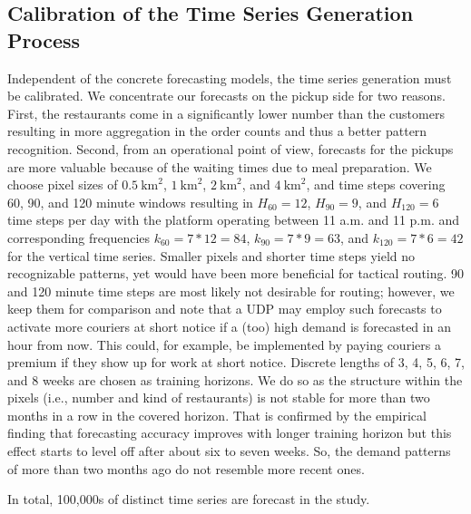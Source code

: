 \subsection{Calibration of the Time Series Generation Process}
\label{params}

Independent of the concrete forecasting models, the time series generation
    must be calibrated.
We concentrate our forecasts on the pickup side for two reasons.
First, the restaurants come in a significantly lower number than the
    customers resulting in more aggregation in the order counts and thus a
    better pattern recognition.
Second, from an operational point of view, forecasts for the pickups are more
    valuable because of the waiting times due to meal preparation.
We choose pixel sizes of $0.5~\text{km}^2$, $1~\text{km}^2$, $2~\text{km}^2$,
    and $4~\text{km}^2$, and time steps covering 60, 90, and 120 minute windows
    resulting in $H_{60}=12$, $H_{90}=9$, and $H_{120}=6$ time steps per day
    with the platform operating between 11 a.m. and 11 p.m. and corresponding
    frequencies $k_{60}=7*12=84$, $k_{90}=7*9=63$, and $k_{120}=7*6=42$ for the
    vertical time series.
Smaller pixels and shorter time steps yield no recognizable patterns, yet would
    have been more beneficial for tactical routing.
90 and 120 minute time steps are most likely not desirable for routing; however,
    we keep them for comparison and note that a UDP may employ such forecasts
    to activate more couriers at short notice if a (too) high demand is
    forecasted in an hour from now.
This could, for example, be implemented by paying couriers a premium if they
    show up for work at short notice.
Discrete lengths of 3, 4, 5, 6, 7, and 8 weeks are chosen as training
    horizons.
We do so as the structure within the pixels (i.e., number and kind of
    restaurants) is not stable for more than two months in a row in the
    covered horizon.
That is confirmed by the empirical finding that forecasting accuracy
    improves with longer training horizon but this effect starts to
    level off after about six to seven weeks.
So, the demand patterns of more than two months ago do not resemble more
    recent ones.

In total, 100,000s of distinct time series are forecast in the study.
